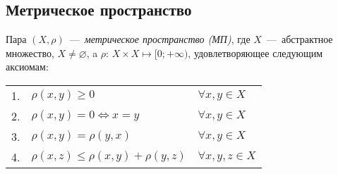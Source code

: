 \subsection{Метрическое пространство}

\begin{definition}
    Пара $(X, \rho)$~---~\textit{метрическое пространство (МП)}, где $X$~---~абстрактное множество, $X \neq \varnothing$, a $\rho$: $X \times X \mapsto [0; +\infty)$, удовлетворяющее следующим аксиомам:
\end{definition}
\begin{tabular}{lll}
    1. & $\rho(x, y) \geq 0$ & $\forall x, y \in X$\\
    2. & $\rho(x, y) = 0 \Leftrightarrow x = y$ & $\forall x, y \in X$ \\
    3. & $\rho(x, y) = \rho(y, x)$ & $\forall x, y \in X$ \\
    4. & $\rho(x, z) \leq \rho(x, y) + \rho(y, z)$& $\forall x, y, z \in X$ 
    \end{tabular}

